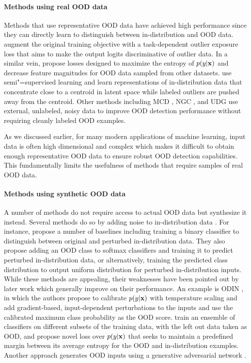 \paragraph{Methods using real OOD data}
Methods that use representative OOD data have achieved high performance since they can directly learn to distinguish between in-distribution and OOD data. 
\textcite{hendrycks_deep_2019} augment the original training objective with a task-dependent outlier exposure loss that aims to make the output logits discriminative of outlier data. 
In a similar vein, \textcite{dhamija_reducing_2018} propose losses designed to maximize the entropy of $p(y|{\mathbf{x}})$ and decrease feature magnitudes for OOD data sampled from other datasets. 
\textcite{ruff_deep_2020} use semi"=supervised learning and learn representations of in-distribution data that concentrate close to a centroid in latent space while labeled outliers are pushed away from the centroid. 
Other methods including MCD \parencite{yu_unsupervised_2019}, NGC \parencite{wu_ngc_2021}, and UDG \parencite{yang_semantically_2021} use external, unlabeled, noisy data to improve OOD detection performance without requiring cleanly labeled OOD examples. 

As we discussed earlier, for many modern applications of machine learning, input data is often high dimensional and complex which makes it difficult to obtain enough representative OOD data to ensure robust OOD detection capabilities. This fundamentally limits the usefulness of methods that require samples of real OOD data.

\paragraph{Methods using synthetic OOD data}
A number of methods do not require access to actual OOD data but synthesize it instead. 
Several methods do so by adding noise to in-distribution data \parencite{liang_enhancing_2018, lee_simple_2018, ren_likelihood_2019}. 
For instance, \textcite{ren_likelihood_2019} propose a number of baselines including training a binary classifier to distinguish between original and perturbed in-distribution data. They also propose adding an OOD class to softmax classifiers and training it to predict perturbed in-distribution data, or alternatively, training the predicted class distribution to output uniform distribution for perturbed in-distribution inputs. 
While these methods are appealing, their weaknesses have been pointed out by later work which generally improve on their performance. An example is ODIN \parencite{liang_enhancing_2018}, in which the authors propose to calibrate $p(y|{\mathbf{x}})$ with temperature scaling \parencite{guo_calibration_2017} and add gradient-based, input-dependent perturbations to the inputs and use the calibrated maximum class probability as the OOD score. 
\textcite{vyas_outofdistribution_2018} train an ensemble of classifiers on different subsets of the training data, with the left out data taken as OOD, and propose novel loss over $p(y|{\mathbf{x}})$ that seeks to maintain a predefined margin between its average entropy for the OOD and in-distribution examples. 
Another approach generates OOD inputs using a generative adversarial network \parencite{lee_training_2018}. 

